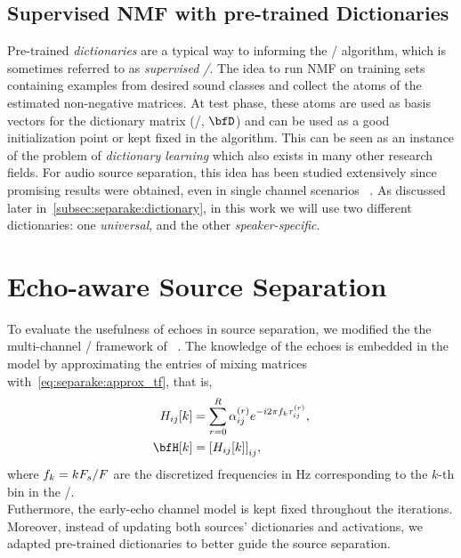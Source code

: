 \subsection{Supervised NMF with pre-trained Dictionaries}
Pre-trained \textit{dictionaries} are a typical way to informing the \NMF/ algorithm, which is sometimes referred to as \textit{supervised \NMF/}.
The idea to run NMF on training sets containing examples from desired sound classes and collect the atoms of the estimated non-negative matrices.
At test phase, these atoms are used as basis vectors for the dictionary matrix (\ie/, $\mD$) and can be used as a good initialization point or kept fixed in the algorithm.
This can be seen as an instance of the problem of \textit{dictionary learning} which also exists in many other research fields.
For audio source separation, this idea has been studied extensively since promising results were obtained, even in single channel scenarios ~.
As discussed later in~\cref{subsec:separake:dictionary}, in this work we will use two different dictionaries: one \textit{universal}, and the other \textit{speaker-specific}.


\section{Echo-aware Source Separation}
To evaluate the usefulness of echoes in source separation, we modified the the multi-channel \NMF/ framework of \citeauthor{ozerov2010multichannel}~.
The knowledge of the echoes is embedded in the model by approximating the entries of mixing matrices with~\eqref{eq:separake:approx_tf}, that is,
\begin{equation}
    \begin{aligned}
        \FLT_{\idxMicSrc}[k] &= \sum_{\idxEch=0}^{\numEchs} \alpha_{\idxMicSrc}^{(\idxEch)} \cste^{-\csti 2 \pi f_k \tau_{\idxMicSrc}^{(\idxEch)}},\\
        \FLTSS[k] &= \kbracket{\FLT_{\idxMicSrc}[k]}_{\idxMicSrc},
    \end{aligned}
\end{equation}
where $f_k = kF_s/F$ are the discretized frequencies in Hz corresponding to the $k$-th bin in the \DFT/.
\\Futhermore, the early-echo channel model is kept fixed throughout the iterations.
Moreover, instead of updating both sources' dictionaries and activations, we adapted pre-trained dictionaries to better guide the source separation.


